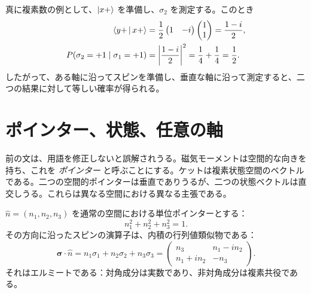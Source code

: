 真に複素数の例として、\(\left\lvert x+\right\rangle\) を準備し、\(\sigma_2\) を測定する。このとき
\begin{align}
  \left\langle y+\,\middle|\,x+\right\rangle
  &=
  \frac12
  \begin{pmatrix}1&-i\end{pmatrix}
  \begin{pmatrix}1\\1\end{pmatrix}
  =\frac{1-i}{2},
  \notag\\
  P(\sigma_2=+1\mid\sigma_1=+1)
  &=\left|\frac{1-i}{2}\right|^2
  =\frac14+\frac14
  =\frac12.
  \label{eq:l03-complex-probability-example}
\end{align}
したがって、ある軸に沿ってスピンを準備し、垂直な軸に沿って測定すると、二つの結果に対して等しい確率が得られる。

\section{ポインター、状態、任意の軸}

前の文は、用語を修正しないと誤解されうる。磁気モーメントは空間的な向きを持ち、これを \emph{ポインター} と呼ぶことにする。ケットは複素状態空間のベクトルである。二つの空間的ポインターは垂直でありうるが、二つの状態ベクトルは直交しうる。これらは異なる空間における異なる主張である。

\begin{classroomqa}
\end{classroomqa}

\begin{classroomqa}
\end{classroomqa}

\(\hat n=(n_1,n_2,n_3)\) を通常の空間における単位ポインターとする：
\begin{equation}
  n_1^2+n_2^2+n_3^2=1.
\end{equation}
その方向に沿ったスピンの演算子は、内積の行列値類似物である：
\begin{equation}
  \boldsymbol{\sigma}\cdot\hat n
  =
  n_1\sigma_1+n_2\sigma_2+n_3\sigma_3
  =
  \begin{pmatrix}
    n_3&n_1-in_2\\
    n_1+in_2&-n_3
  \end{pmatrix}.
  \label{eq:l03-spin-arbitrary-axis}
\end{equation}
それはエルミートである：対角成分は実数であり、非対角成分は複素共役である。


